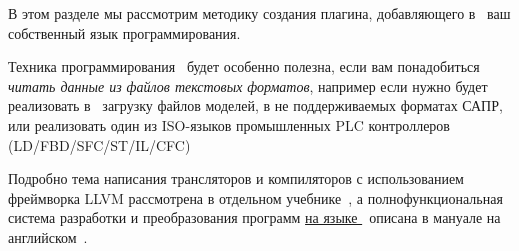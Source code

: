 \label{script}\secdown

В этом разделе мы рассмотрим методику создания плагина, добавляющего в
\vrep\ ваш собственный язык программирования. 

\begin{framed}\noindent
Техника программирования \ будет особенно 
полезна, если вам понадобиться \emph{читать данные из файлов текстовых
форматов}, например если
нужно будет реализовать в \vrep\ загрузку файлов моделей, в не поддерживаемых
форматах САПР, или реализовать один из ISO-языков промышленных PLC контроллеров
(LD/FBD/SFC/ST/IL/CFC)
\end{framed}

Подробно тема написания трансляторов и компиляторов с использованием 
фреймворка LLVM рассмотрена в отдельном учебнике\ \cite{lexman},
а полнофункциональная система разработки и преобразования программ 
\href{https://github.com/ponyatov/Y}{на языке \bi}\ описана в 
мануале на английском\ \cite{biman}.




\secup
